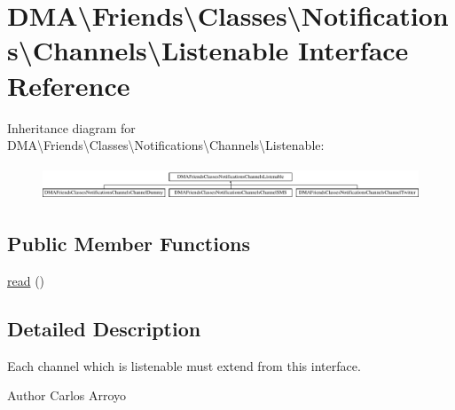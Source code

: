 \hypertarget{interfaceDMA_1_1Friends_1_1Classes_1_1Notifications_1_1Channels_1_1Listenable}{\section{D\+M\+A\textbackslash{}Friends\textbackslash{}Classes\textbackslash{}Notifications\textbackslash{}Channels\textbackslash{}Listenable Interface Reference}
\label{interfaceDMA_1_1Friends_1_1Classes_1_1Notifications_1_1Channels_1_1Listenable}
}
Inheritance diagram for D\+M\+A\textbackslash{}Friends\textbackslash{}Classes\textbackslash{}Notifications\textbackslash{}Channels\textbackslash{}Listenable\+:\begin{figure}[H]
\begin{center}
\leavevmode
\includegraphics[height=1.020036cm]{d7/d72/interfaceDMA_1_1Friends_1_1Classes_1_1Notifications_1_1Channels_1_1Listenable}
\end{center}
\end{figure}
\subsection*{Public Member Functions}
\begin{DoxyCompactItemize}
\item 
\hyperlink{interfaceDMA_1_1Friends_1_1Classes_1_1Notifications_1_1Channels_1_1Listenable_aebc4dc5c57897e075a719e911a590d6e}{read} ()
\end{DoxyCompactItemize}


\subsection{Detailed Description}
Each channel which is listenable must extend from this interface. \begin{DoxyAuthor}{Author}
Carlos Arroyo 
\end{DoxyAuthor}


